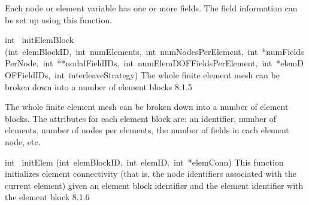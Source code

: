\documentclass{article}
\begin{document}
\begin{cxxentry}
\begin{cxxentry}
\begin{cxxfunction}
\begin{cxxdoc}
Each node or element variable has one or more fields. The field
information can be set up using this function.

\end{cxxdoc}
\end{cxxfunction}
\begin{cxxfunction}
{int\ }
        {initElemBlock}
        {(int\ elemBlockID,\ int\ numElements,\ int\ numNodesPerElement,\ int\ *numFieldsPerNode,\ int\ **nodalFieldIDs,\ int\ numElemDOFFieldsPerElement,\ int\ *elemDOFFieldIDs,\ int\ interleaveStrategy)}
        {
The whole finite element mesh can be broken down into a number of
element blocks}
        {8.1.5}
\begin{cxxdoc}

The whole finite element mesh can be broken down into a number of
element blocks. The attributes for each element block are: an
identifier, number of elements, number of nodes per elements, 
the number of fields in each element node, etc.

\end{cxxdoc}
\end{cxxfunction}
\begin{cxxfunction}
{int\ }
        {initElem}
        {(int\ elemBlockID,\ int\ elemID,\ int\ *elemConn)}
        {
This function initializes element connectivity (that is, the node
identifiers associated with the current element) given an element 
block identifier and the element identifier with the element block}
        {8.1.6}
\begin{cxxdoc}


\end{cxxdoc}
\end{cxxfunction}
\end{cxxentry}
\end{cxxentry}
\end{document}
